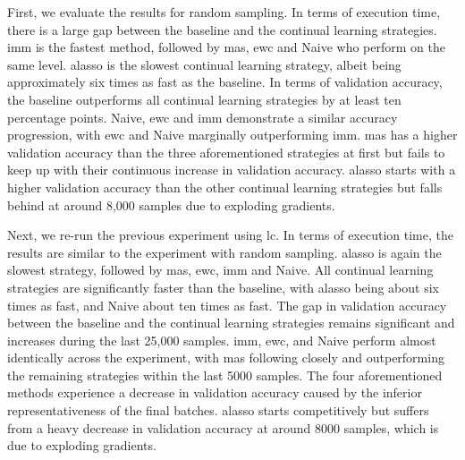 First, we evaluate the results for random sampling. In terms of execution time, there is a large gap between the baseline and the continual learning strategies.
\gls{imm} is the fastest method, followed by \gls{mas}, \gls{ewc} and Naive who perform on the same level. \gls{alasso} is the slowest continual learning strategy,
albeit being approximately six times as fast as the baseline. In terms of validation accuracy, the baseline outperforms all continual learning strategies by at
least ten percentage points. Naive, \gls{ewc} and \gls{imm} demonstrate a similar accuracy progression, with \gls{ewc} and Naive marginally outperforming \gls{imm}.
\gls{mas} has a higher validation accuracy than the three aforementioned strategies at first but fails to keep up with their continuous increase in validation accuracy.
\gls{alasso} starts with a higher validation accuracy than the other continual learning strategies but falls behind at around 8,000 samples due to exploding
gradients. \par
 

Next, we re-run the previous experiment using \gls{lc}. In terms of execution time, the results are similar to the experiment with random sampling. \gls{alasso} is again
the slowest strategy, followed by \gls{mas}, \gls{ewc}, \gls{imm} and Naive. All continual learning strategies are significantly faster than the baseline, with \gls{alasso}
being about six times as fast, and Naive about ten times as fast. The gap in validation accuracy between the baseline and the continual learning strategies remains significant
and increases during the last 25,000 samples. \gls{imm}, \gls{ewc}, and Naive perform almost identically across the experiment, with \gls{mas} following closely and outperforming
the remaining strategies within the last 5000 samples. The four aforementioned methods experience a decrease in validation accuracy caused by the inferior representativeness
of the final batches. \gls{alasso} starts competitively but suffers from a heavy decrease in validation accuracy at around 8000 samples, which is due to exploding gradients. \par


